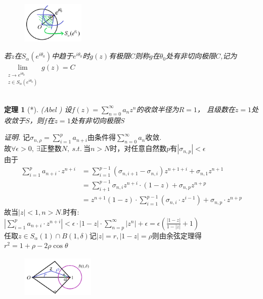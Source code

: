 \documentclass[b5paper,decoration]{qyxf-book}%
\newtheorem{mypro}{定理}[section]%
\begin{document}
\begin{figure}
    \centering
    \includegraphics[width=3cm,height=2cm]{ch4_p4_1st.png}
\end{figure}
\noindent \emph{若$z$在$S_\alpha(e^{i\theta_0})$中趋于$e^{i\theta_0}$时$g(z)$有极限$C$则称$g$在$\theta_0$处有非切向极限$C$,记为
$\displaystyle{\lim\limits_{\substack{z\to e^{i\theta_0}\\z\in S_\alpha(e^{i\theta_0})}}g(z)=C}$}
\\
\\
\begin{mypro}[*](\rm Abel \uppercase\expandafter{})
    设$\displaystyle{f(z)=\sum\limits_{n=0}^\infty a_nz^n}$的收敛半径为$R=1$，
    且级数在$z=1$处收敛于$S$，则$f$在$z=1$处有非切向极限$S$
\end{mypro}
\noindent\emph{证明.}
记$\displaystyle{\sigma_{n,\rho}=\sum\limits_{i=1}^p a_{n+i}}$由条件得$\displaystyle{\sum\limits_{n=0}^\infty a_n}$收敛.\\
故$\forall\epsilon>0 ,\ \exists$正整数$N,\  s.t.\ $当$n>N$时，对任意自然数$p$有$|\sigma_{n,p}|<\epsilon$\\
由于
\begin{align*}
    \sum\limits_{i=1}^pa_{n+i}\cdot z^{n+i}&=\sum\limits_{i=1}^{p-1}(\sigma_{n,i+1}-\sigma_{n,i})z^{n+1+i}+\sigma_{n,1}z^{n+1}\\
    &=\sum\limits_{i+1}^{p-1}\sigma_{n,i}z^{n+i}\cdot(1-z)+\sigma_{n,p}z^{n+p}\\
    &=z^{n+1}(1-z)\cdot\sum\limits_{i=1}^{p-1}(\sigma_{n,i}\cdot z^{i-1})+\sigma_{n,p}\cdot z^{n+p}
\end{align*}
故当$|z|<1,n>N$.时有:$\displaystyle{\left|\sum\limits_{i=1}^pa_{n+i}\cdot z^{n+i}\right|
<\epsilon\cdot|1-z|\cdot\sum\limits_{n=p}^\infty|z^n|+\epsilon=\epsilon\left(\frac{|1-z|}{1-|z|}+1\right)}$\\
任取$\displaystyle{z\in S_\alpha(1)\cap B(1,\delta)}$记$|z|=r,|1-z|=\rho$则由余弦定理得$r^2=1+\rho-2\rho\cos\theta$\\
\begin{figure}
    \centering
    \includegraphics[width=3.5cm,height=2.0cm]{ch4_p4_2nd.png}
\end{figure}
\end{document}
